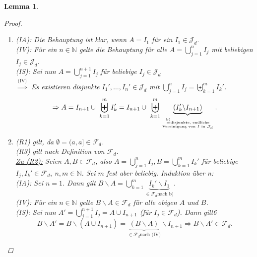 \documentclass[a4paper]{report}
\newcommand{\N}{\mathbb{N}}
\newcommand{\Fd}{\mathcal{F}_d}
\newcommand{\Jd}{\mathcal{J}_d}
\newcommand{\bigdcup}{\biguplus}
\theoremstyle{plain}
\newtheorem{lem}[thm]{Lemma}
\theoremstyle{definition}
\begin{document}
{{{\begin{lem}
\begin{proof}
\begin{enumerate}
\begin{displaymath}
\begin{split}
                    \end{split}                    
                \end{displaymath}
                Nach (IV) ist dies eine disjunkte Vereinigung $\hat{I}_k \in \mathcal{J}_{d+1}$.
            \item
                (IA): Die Behauptung ist klar, wenn $A=I_1$ für ein $I_1\in \Jd$.\\
                (IV): Für ein $n \in\N$ gelte die Behauptung für alle $A = \bigcup_{j=1}^n I_j$ mit beliebigen $I_j \in \Jd$.\\
                (IS): Sei nun $A = \bigcup_{j=1}^{n+1} I_j$ für beliebige $I_j \in \Jd $\\
                $\overset{\text{(IV)}}{\Rightarrow}$ Es existieren disjunkte $I_1', \dots, I_n' \in \Jd$ mit $\bigcup_{j=1}^n I_j = \bigdcup_{k=1}^m I_k'$.
                \begin{displaymath}
                     \Rightarrow A = I_{n+1} \cup \ \bigdcup_{k=1}^m I_k' = I_{n+1} \cup \ \bigdcup_{k=1}^m \underbrace{(I_k'\backslash I_{n+1})}_{\genfrac{}{}{0pt}{}{\overset{\text{b)}}{=}\text{disjunkte, endliche}}{\text{Vereinigung von $I$ in $\Jd$}}}.
                \end{displaymath}
            \item
                (R1) gilt, da $\emptyset = (a, a] \in \Fd$.\\
                (R3) gilt nach Definition von $\Fd$.\\
                \uline{Zu (R2):} Seien $A,B \in \Fd$, also $A=\bigcup_{j=1}^n I_j, B= \bigcup_{k=1}^m I_k'$ für beliebige $I_j, I_k' \in \Fd, \ n,m \in \N$. Sei $m$ fest aber beliebig. Induktion über n:\\
                (IA): Sei $n=1$. Dann gilt $B\backslash A = \bigcup_{k=1}^m \underbrace{I_k'\backslash I_1}_{\in \Fd \text{nach b)}}$.\\
                (IV): Für ein $n \in\N$ gelte $B\backslash A \in \Fd$ für alle obigen $A$ und $B$.\\
                (IS): Sei nun $A' = \bigcup_{j=1}^{n+1} I_j = A \cup I_{n+1}$ (für $I_j \in \Fd$). Dann gilt6
                \begin{displaymath}
                    B\backslash A' = B\backslash (A \cup I_{n+1}) = \underbrace{(B \backslash A)}_{\in \Fd \text{nach (IV)}} \backslash I_{n+1} \Rightarrow B \backslash A' \in \Fd.
                \end{displaymath}
        \end{enumerate}
    \end{proof}
\end{lem}

}}}
\end{document}
